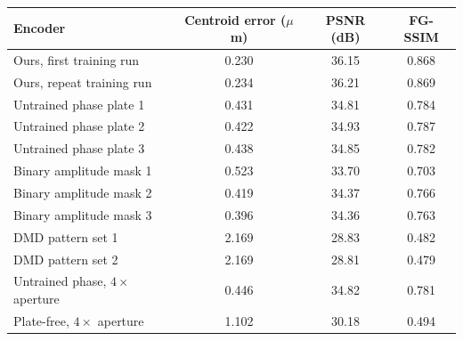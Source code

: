 \begin{tabular}{@{}lccc@{}}
\toprule
Encoder & Centroid error ($\mu$m) & PSNR (dB) & FG-SSIM\\
\midrule
Ours, first training run & 0.230 & 36.15 & 0.868\\
Ours, repeat training run & 0.234 & 36.21 & 0.869\\
Untrained phase plate 1 & 0.431 & 34.81 & 0.784\\
Untrained phase plate 2 & 0.422 & 34.93 & 0.787\\
Untrained phase plate 3 & 0.438 & 34.85 & 0.782\\
Binary amplitude mask 1 & 0.523 & 33.70 & 0.703\\
Binary amplitude mask 2 & 0.419 & 34.37 & 0.766\\
Binary amplitude mask 3 & 0.396 & 34.36 & 0.763\\
DMD pattern set 1 & 2.169 & 28.83 & 0.482\\
DMD pattern set 2 & 2.169 & 28.81 & 0.479\\
\midrule
Untrained phase, $4\times$ aperture & 0.446 & 34.82 & 0.781\\
Plate-free, $4\times$ aperture & 1.102 & 30.18 & 0.494\\
\bottomrule
\end{tabular}
